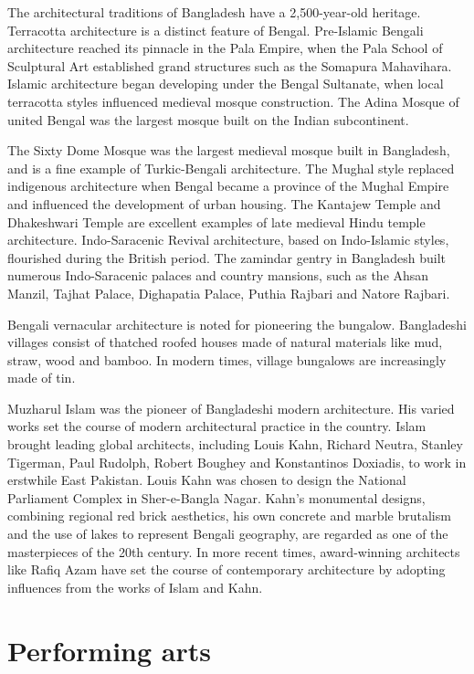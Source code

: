 The architectural traditions of Bangladesh have a 2,500-year-old
heritage. Terracotta architecture is a distinct feature of Bengal.
Pre-Islamic Bengali architecture reached its pinnacle in the Pala
Empire, when the Pala School of Sculptural Art established grand
structures such as the Somapura Mahavihara. Islamic architecture began
developing under the Bengal Sultanate, when local terracotta styles
influenced medieval mosque construction. The Adina Mosque of united
Bengal was the largest mosque built on the Indian subcontinent.

The Sixty Dome Mosque was the largest medieval mosque built in
Bangladesh, and is a fine example of Turkic-Bengali architecture. The
Mughal style replaced indigenous architecture when Bengal became a
province of the Mughal Empire and influenced the development of urban
housing. The Kantajew Temple and Dhakeshwari Temple are excellent
examples of late medieval Hindu temple architecture. Indo-Saracenic
Revival architecture, based on Indo-Islamic styles, flourished during
the British period. The zamindar gentry in Bangladesh built numerous
Indo-Saracenic palaces and country mansions, such as the Ahsan Manzil,
Tajhat Palace, Dighapatia Palace, Puthia Rajbari and Natore Rajbari.

Bengali vernacular architecture is noted for pioneering the bungalow.
Bangladeshi villages consist of thatched roofed houses made of natural
materials like mud, straw, wood and bamboo. In modern times, village
bungalows are increasingly made of tin.

Muzharul Islam was the pioneer of Bangladeshi modern architecture. His
varied works set the course of modern architectural practice in the
country. Islam brought leading global architects, including Louis Kahn,
Richard Neutra, Stanley Tigerman, Paul Rudolph, Robert Boughey and
Konstantinos Doxiadis, to work in erstwhile East Pakistan. Louis Kahn
was chosen to design the National Parliament Complex in Sher-e-Bangla
Nagar. Kahn's monumental designs, combining regional red brick
aesthetics, his own concrete and marble brutalism and the use of lakes
to represent Bengali geography, are regarded as one of the masterpieces
of the 20th century. In more recent times, award-winning architects like
Rafiq Azam have set the course of contemporary architecture by adopting
influences from the works of Islam and Kahn.

\section{Performing arts}\label{performing-arts}

